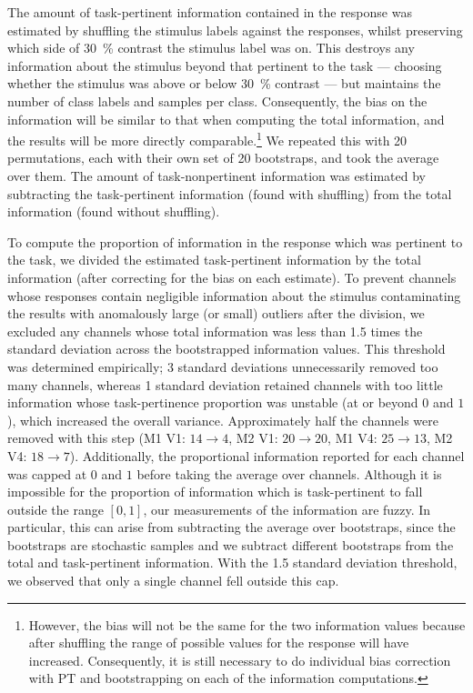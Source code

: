 The amount of task-pertinent information contained in the response was estimated by shuffling the stimulus labels against the responses, whilst preserving which side of \SI{30}{\percent} contrast the stimulus label was on.
This destroys any information about the stimulus beyond that pertinent to the task --- choosing whether the stimulus was above or below \SI{30}{\percent} contrast --- but maintains the number of class labels and samples per class.
Consequently, the bias on the information will be similar to that when computing the total information, and the results will be more directly comparable.\footnote{However, the bias will not be the same for the two information values because after shuffling the range of possible values for the response will have increased. Consequently, it is still necessary to do individual bias correction with \ac{PT} and bootstrapping on each of the information computations.}
We repeated this with \num{20} permutations, each with their own set of \num{20} bootstraps, and took the average over them.
The amount of task-nonpertinent information was estimated by subtracting the task-pertinent information (found with shuffling) from the total information (found without shuffling).

To compute the proportion of information in the response which was pertinent to the task, we divided the estimated task-pertinent information by the total information (after correcting for the bias on each estimate).
To prevent channels whose responses contain negligible information about the stimulus contaminating the results with anomalously large (or small) outliers after the division, we excluded any channels whose total information was less than \num{1.5} times the standard deviation across the bootstrapped information values.
This threshold was determined empirically; \num{3} standard deviations unnecessarily removed too many channels, whereas \num{1} standard deviation retained channels with too little information whose task-pertinence proportion was unstable (at or beyond $0$ and $1$), which increased the overall variance.
Approximately half the channels were removed with this step (\ac{M1} \ac{V1}: $14\to4$, \ac{M2} \ac{V1}: $20\to20$, \ac{M1} \ac{V4}: $25\to13$, \ac{M2} \ac{V4}: $18\to7$).
Additionally, the proportional information reported for each channel was capped at $0$ and $1$ before taking the average over channels.
Although it is impossible for the proportion of information which is task-pertinent to fall outside the range $[0, 1]$, our measurements of the information are fuzzy.
In particular, this can arise from subtracting the average over bootstraps, since the bootstraps are stochastic samples and we subtract different bootstraps from the total and task-pertinent information.
With the \num{1.5} standard deviation threshold, we observed that only a single channel fell outside this cap.

